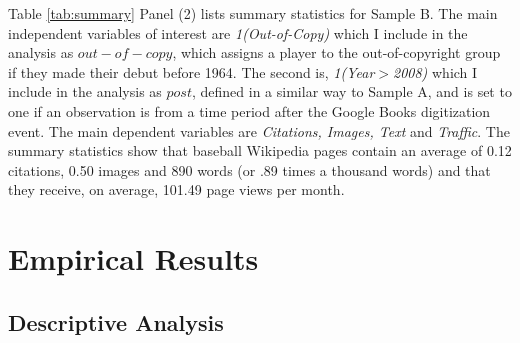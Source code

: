 \documentclass[11pt]{article}
\begin{document}
Table \ref{tab:summary} Panel (2) lists summary statistics for Sample B. The main independent variables of interest are \emph{1(Out-of-Copy)} which I include in the analysis as $out-of-copy$, which assigns a player to the out-of-copyright group if they made their debut before 1964. The second is, \emph{1(Year$>$2008)} which I include in the analysis as $post$, defined in a similar way to Sample A, and is set to one if an observation is from a time period after the Google Books digitization event. The main dependent variables are \emph{Citations, Images, Text} and \emph{Traffic}. The summary statistics show that baseball Wikipedia pages contain an average of 0.12 citations, 0.50 images and 890 words (or .89 times a thousand words) and that they receive, on average, 101.49 page views per month. 




\section{Empirical Results}
\label{sec:baseline}








\subsection{Descriptive Analysis}
\end{document}
